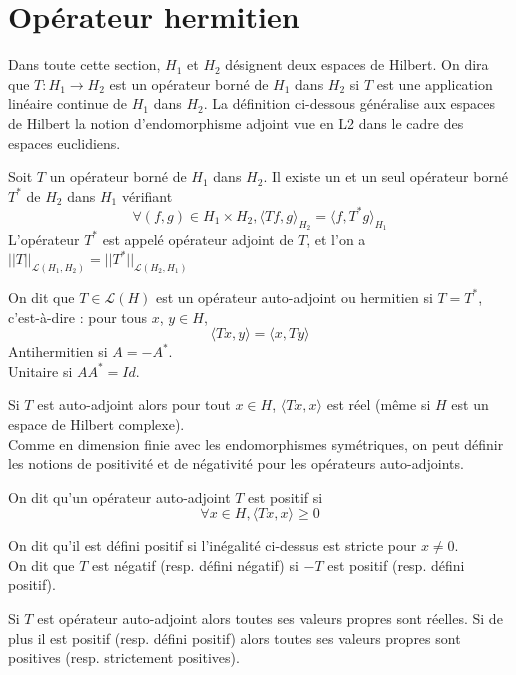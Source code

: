 \section{Opérateur hermitien}
Dans toute cette section, $H_1$ et $H_2$ désignent deux espaces de Hilbert. On dira que $T : H_1 \rightarrow
H_2$ est un opérateur borné de $H_1$ dans $H_2$ si $T$ est une application linéaire continue de $H_1$
dans $H_2$. La définition ci-dessous généralise aux espaces de Hilbert la notion d’endomorphisme adjoint vue en L2 dans le cadre des espaces euclidiens.
\begin{theorem}
Soit $T$ un opérateur borné de $H_1$ dans $H_2$. Il existe un et un seul opérateur borné $T^*$ de $H_2$ dans $H_1$ vérifiant
\begin{equation*}
\forall (f,g) \in H_1 \times H_2, \langle Tf,g \rangle_{H_2} = \langle f,T^* g \rangle_{H_1}
\end{equation*}
L’opérateur $T^*$ est appelé opérateur adjoint de $T$, et l'on a $||T||_{\mathcal{L}(H_1,H_2)} = ||T^*||_{\mathcal{L}(H_2,H_1)}$
\end{theorem}
\begin{definition}
	On dit que $T\in \mathcal{L}(H)$ est un opérateur auto-adjoint ou hermitien si $T=T^*$, c’est-à-dire : pour tous $x$, $y \in H$,
	\begin{equation*}
	\langle Tx, y \rangle = \langle x, Ty \rangle
	\end{equation*} Antihermitien si $A=-A^*$.\\
	Unitaire si $AA^*=Id$.
\end{definition}
Si $T$ est auto-adjoint alors pour tout $x \in H$, $\langle Tx , x\rangle$ est réel (même si $H$ est un espace de Hilbert complexe).\\
Comme en dimension finie avec les endomorphismes symétriques, on peut définir les notions de positivité et de négativité pour les opérateurs auto-adjoints.
\begin{definition}
On dit qu’un opérateur auto-adjoint $T$ est positif si\begin{equation*}
\forall x \in H, \langle Tx,x \rangle \geq 0
\end{equation*}
\end{definition}
On dit qu’il est défini positif si l’inégalité ci-dessus est stricte pour $x \neq 0$.\\
On dit que $T$ est négatif (resp. défini négatif) si $-T$ est positif (resp. défini positif).
\begin{proposition}
Si $T$ est opérateur auto-adjoint alors toutes ses valeurs propres sont réelles. Si de plus il est positif (resp. défini positif) alors toutes ses valeurs propres sont positives (resp. strictement positives).
\end{proposition}
